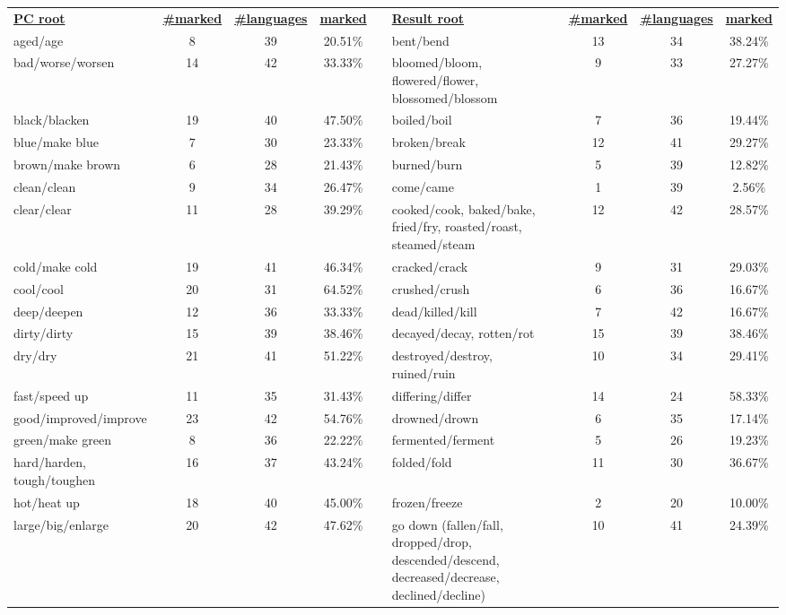 \begin{tabular}{p{3cm}ccccp{3cm}ccc}
\underline{\textbf{PC root}} & \underline{\textbf{\#marked}} & \underline{\textbf{\#languages}} & \underline{\textbf{marked}} & & \underline{\textbf{Result root}} & \underline{\textbf{\#marked}} & \underline{\textbf{\#languages}} & \underline{\textbf{marked}} \\
aged/age & 8 & 39 & 20.51\% & & bent/bend & 13 & 34 & 38.24\% \\
bad/worse/worsen & 14 & 42 & 33.33\% & & bloomed/bloom, flowered/flower, blossomed/blossom & 9 & 33 & 27.27\% \\
black/blacken & 19 & 40 & 47.50\% & & boiled/boil & 7 & 36 & 19.44\% \\
blue/make blue & 7 & 30 & 23.33\% & & broken/break & 12 & 41 & 29.27\% \\
brown/make brown & 6 & 28 & 21.43\% & & burned/burn & 5 & 39 & 12.82\% \\
clean/clean & 9 & 34 & 26.47\% & & come/came & 1 & 39 & 2.56\% \\
clear/clear & 11 & 28 & 39.29\% & & cooked/cook, baked/bake, fried/fry, roasted/roast, steamed/steam & 12 & 42 & 28.57\% \\
cold/make cold & 19 & 41 & 46.34\% & & cracked/crack & 9 & 31 & 29.03\% \\
cool/cool & 20 & 31 & 64.52\% & & crushed/crush & 6 & 36 & 16.67\% \\
deep/deepen & 12 & 36 & 33.33\% & & dead/killed/kill & 7 & 42 & 16.67\% \\
dirty/dirty & 15 & 39 & 38.46\% & & decayed/decay, rotten/rot & 15 & 39 & 38.46\% \\
dry/dry & 21 & 41 & 51.22\% & & destroyed/destroy, ruined/ruin & 10 & 34 & 29.41\% \\
fast/speed up & 11 & 35 & 31.43\% & & differing/differ & 14 & 24 & 58.33\% \\
good/improved/improve & 23 & 42 & 54.76\% & & drowned/drown & 6 & 35 & 17.14\% \\
green/make green & 8 & 36 & 22.22\% & & fermented/ferment & 5 & 26 & 19.23\% \\
hard/harden, tough/toughen & 16 & 37 & 43.24\% & & folded/fold & 11 & 30 & 36.67\% \\
hot/heat up & 18 & 40 & 45.00\% & & frozen/freeze & 2 & 20 & 10.00\% \\
large/big/enlarge & 20 & 42 & 47.62\% & & go down (fallen/fall, dropped/drop, descended/descend, decreased/decrease, declined/decline) & 10 & 41 & 24.39\% \\

\end{tabular}
